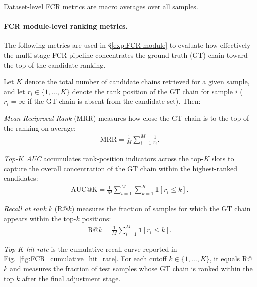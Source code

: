 \documentclass[sigconf,10pt]{acmart} %
\begin{document}
Dataset-level FCR metrics are macro averages over all samples.

\paragraph{FCR module-level ranking metrics.}
\label{FCR_module_metrics}
The following metrics are used in \S\ref{exp:FCR module} to evaluate how effectively the multi-stage FCR pipeline concentrates the ground-truth (GT) chain toward the top of the candidate ranking.

Let $K$ denote the total number of candidate chains retrieved for a given sample, and let $r_i\in\{1,\ldots,K\}$ denote the rank position of the GT chain for sample $i$ ($r_i=\infty$ if the GT chain is absent from the candidate set). Then:

\textit{Mean Reciprocal Rank} (MRR) measures how close the GT chain is to the top of the ranking on average:
\begin{align}
\mathrm{MRR} = \frac{1}{M}\sum_{i=1}^{M}\frac{1}{r_i}.
\end{align}

\textit{Top-$K$ AUC} accumulates rank-position indicators across the top-$K$ slots to capture the overall concentration of the GT chain within the highest-ranked candidates:
\begin{align}
\mathrm{AUC@K} = \frac{1}{M}\sum_{i=1}^{M}\sum_{k=1}^{K}\mathbf{1}[r_i\leq k].
\end{align}

\textit{Recall at rank $k$} (R@$k$) measures the fraction of samples for which the GT chain appears within the top-$k$ positions:
\begin{align}
\mathrm{R@}k = \frac{1}{M}\sum_{i=1}^{M}\mathbf{1}[r_i\leq k].
\end{align}

\textit{Top-$K$ hit rate} is the cumulative recall curve reported in Fig.~\ref{fig:FCR_cumulative_hit_rate}. For each cutoff $k\in\{1,\ldots,K\}$, it equals R@$k$ and measures the fraction of test samples whose GT chain is ranked within the top $k$ after the final adjustment stage.
\end{document}
